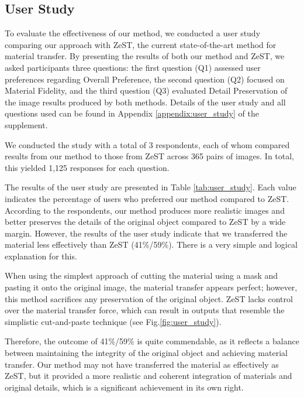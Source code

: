 \subsection{User Study}

To evaluate the effectiveness of our method, we conducted a user study comparing our approach with ZeST, the current state-of-the-art method for material transfer. By presenting the results of both our method and ZeST, we asked participants three questions: the first question (Q1) assessed user preferences regarding Overall Preference, the second question (Q2) focused on Material Fidelity, and the third question (Q3) evaluated Detail Preservation of the image results produced by both methods. Details of the user study and all questions used can be found in Appendix \ref{appendix:user_study} of the supplement.

We conducted the study with a total of 3 respondents, each of whom compared results from our method to those from ZeST across 365 pairs of images. In total, this yielded 1,125 responses for each question.



The results of the user study are presented in Table \ref{tab:user_study}. Each value indicates the percentage of users who preferred our method compared to ZeST. According to the respondents, our method produces more realistic images and better preserves the details of the original object compared to ZeST by a wide margin. However, the results of the user study indicate that we transferred the material less effectively than ZeST (41\%/59\%). There is a very simple and logical explanation for this.

When using the simplest approach of cutting the material using a mask and pasting it onto the original image, the material transfer appears perfect; however, this method sacrifices any preservation of the original object. ZeST lacks control over the material transfer force, which can result in outputs that resemble the simplistic cut-and-paste technique (see Fig.\ref{fig:user_study}). 

Therefore, the outcome of 41\%/59\% is quite commendable, as it reflects a balance between maintaining the integrity of the original object and achieving material transfer. Our method may not have transferred the material as effectively as ZeST, but it provided a more realistic and coherent integration of materials and original details, which is a significant achievement in its own right.

